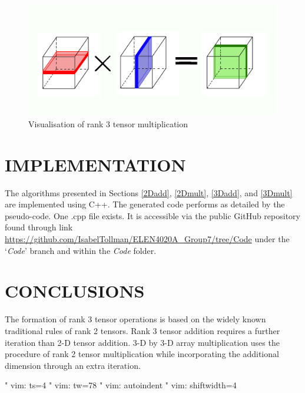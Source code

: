 \begin{figure}[H]
	\centering
	\includegraphics[scale=0.5]{build/3Dmult.png}
	\caption{Visualisation of rank 3 tensor multiplication}
	\label{3D}
\end{figure}

\section{IMPLEMENTATION}

The algorithms presented in Sections \ref{2Dadd}, \ref{2Dmult}, \ref{3Dadd}, and \ref{3Dmult} are implemented using C++. The generated code performs as detailed by the pseudo-code. One .cpp file exists. It is accessible via the public GitHub repository found through link \url{https://github.com/IsabelTollman/ELEN4020A_Group7/tree/Code} under the `\emph{Code}' branch and within the \textit{Code} folder.

\section{CONCLUSIONS}

The formation of rank 3 tensor operations is based on the widely known traditional rules of rank 2 tensors. Rank 3 tensor addition requires a further iteration than 2-D tensor addition. 3-D by 3-D array multiplication uses the procedure of rank 2 tensor multiplication while incorporating the additional dimension through an extra iteration. 

 







" vim: ts=4
" vim: tw=78
" vim: autoindent
" vim: shiftwidth=4
